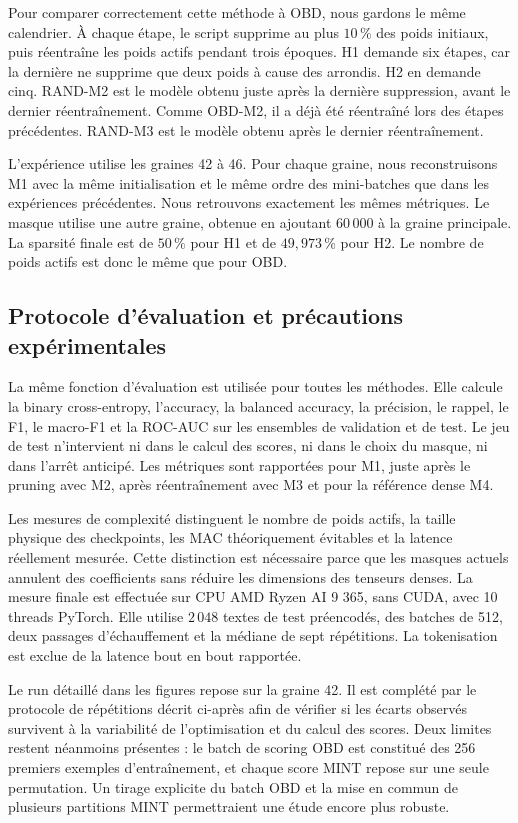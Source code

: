 Pour comparer correctement cette méthode à OBD, nous gardons le même
calendrier. À chaque étape, le script supprime au plus $10\,\%$ des poids
initiaux, puis réentraîne les poids actifs pendant trois époques. H1 demande six
étapes, car la dernière ne supprime que deux poids à cause des arrondis. H2 en
demande cinq. RAND-M2 est le modèle obtenu juste après la dernière suppression,
avant le dernier réentraînement. Comme OBD-M2, il a déjà été réentraîné lors des
étapes précédentes. RAND-M3 est le modèle obtenu après le dernier
réentraînement.

L'expérience utilise les graines 42 à 46. Pour chaque graine, nous reconstruisons
M1 avec la même initialisation et le même ordre des mini-batches que dans les
expériences précédentes. Nous retrouvons exactement les mêmes métriques. Le
masque utilise une autre graine, obtenue en ajoutant $60\,000$ à la graine
principale. La sparsité finale est de $50\,\%$ pour H1 et de
$49{,}973\,\%$ pour H2. Le nombre de poids actifs est donc le même que pour
OBD.

\subsection{Protocole d'évaluation et précautions expérimentales}
\label{ssec:methode_evaluation}

La même fonction d'évaluation est utilisée pour toutes les méthodes. Elle
calcule la binary cross-entropy, l'accuracy, la balanced accuracy, la précision,
le rappel, le F1, le macro-F1 et la ROC-AUC sur les ensembles de validation et
de test. Le jeu de test n'intervient ni dans le calcul des scores, ni dans le
choix du masque, ni dans l'arrêt anticipé. Les métriques sont rapportées
pour M1, juste après le pruning avec M2, après réentraînement avec M3 et pour la
référence dense M4.

Les mesures de complexité distinguent le nombre de poids actifs, la taille
physique des checkpoints, les MAC théoriquement évitables et la latence
réellement mesurée. Cette distinction est nécessaire parce que les masques
actuels annulent des coefficients sans réduire les dimensions des tenseurs
denses. La mesure finale est effectuée sur CPU AMD Ryzen AI 9 365, sans CUDA,
avec 10 threads PyTorch. Elle utilise $2\,048$ textes de test préencodés, des
batches de 512, deux passages d'échauffement et la médiane de sept répétitions.
La tokenisation est exclue de la latence bout en bout rapportée.

Le run détaillé dans les figures repose sur la graine 42. Il est complété par
le protocole de répétitions décrit ci-après afin de vérifier si les écarts
observés survivent à la variabilité de l'optimisation et du calcul des scores.
Deux limites restent néanmoins présentes : le batch de scoring OBD est
constitué des 256 premiers exemples d'entraînement, et chaque score MINT repose
sur une seule permutation. Un tirage explicite du batch OBD et la mise en commun
de plusieurs partitions MINT permettraient une étude encore plus robuste.

